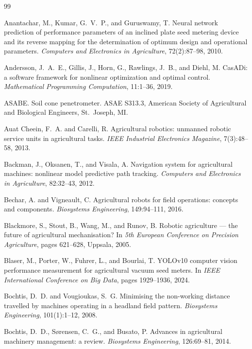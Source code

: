 \clearpage
{}
{}
\begin{thebibliography}{99}

Anantachar, M., Kumar, G.~V.~P., and Guruswamy, T.
Neural network prediction of performance parameters of an inclined plate seed metering device and its reverse mapping for the determination of optimum design and operational parameters.
\textit{Computers and Electronics in Agriculture}, 72(2):87--98, 2010.

Andersson, J.~A.~E., Gillis, J., Horn, G., Rawlings, J.~B., and Diehl, M.
CasADi: a software framework for nonlinear optimization and optimal control.
\textit{Mathematical Programming Computation}, 11:1--36, 2019.

ASABE.
Soil cone penetrometer.
ASAE S313.3, American Society of Agricultural and Biological Engineers, St.~Joseph, MI.

Auat Cheein, F.~A. and Carelli, R.
Agricultural robotics: unmanned robotic service units in agricultural tasks.
\textit{IEEE Industrial Electronics Magazine}, 7(3):48--58, 2013.

Backman, J., Oksanen, T., and Visala, A.
Navigation system for agricultural machines: nonlinear model predictive path tracking.
\textit{Computers and Electronics in Agriculture}, 82:32--43, 2012.

Bechar, A. and Vigneault, C.
Agricultural robots for field operations: concepts and components.
\textit{Biosystems Engineering}, 149:94--111, 2016.

Blackmore, S., Stout, B., Wang, M., and Runov, B.
Robotic agriculture --- the future of agricultural mechanisation?
In \textit{5th European Conference on Precision Agriculture}, pages 621--628, Uppsala, 2005.

Blaser, M., Porter, W., Fuhrer, L., and Bourlai, T.
YOLOv10 computer vision performance measurement for agricultural vacuum seed meters.
In \textit{IEEE International Conference on Big Data}, pages 1929--1936, 2024.

Bochtis, D.~D. and Vougioukas, S.~G.
Minimising the non-working distance travelled by machines operating in a headland field pattern.
\textit{Biosystems Engineering}, 101(1):1--12, 2008.

Bochtis, D.~D., S{\o}rensen, C.~G., and Busato, P.
Advances in agricultural machinery management: a review.
\textit{Biosystems Engineering}, 126:69--81, 2014.


\end{thebibliography}
